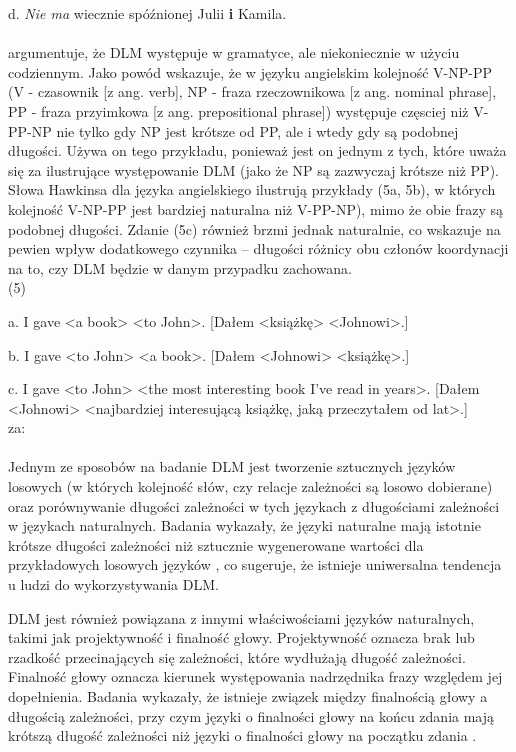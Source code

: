 \documentclass[licencjacka]{pracamgr_Kogni}
\begin{document}
d. \textit{Nie ma} wiecznie spóźnionej Julii \textbf{i} Kamila.
\\
\\
\citet{Hawkins1994} argumentuje, że DLM występuje w gramatyce, ale niekoniecznie w użyciu codziennym. Jako powód wskazuje, że w języku angielskim kolejność V-NP-PP (V - czasownik [z ang. verb], NP - fraza rzeczownikowa [z ang. nominal phrase], PP - fraza przyimkowa [z ang. prepositional phrase]) występuje częsciej niż V-PP-NP nie tylko gdy NP jest krótsze od PP, ale i wtedy gdy są podobnej długości. Używa on tego przykładu, ponieważ jest on jednym z tych, które uważa się za ilustrujące występowanie DLM (jako że NP są zazwyczaj krótsze niż PP). Słowa Hawkinsa dla języka angielskiego ilustrują przykłady (5a, 5b), w których kolejność V-NP-PP jest bardziej naturalna niż V-PP-NP), mimo że obie frazy są podobnej długości. Zdanie (5c) również brzmi jednak naturalnie, co wskazuje na pewien wpływ dodatkowego czynnika --  długości różnicy obu członów koordynacji na to, czy DLM będzie w danym przypadku zachowana.
\\

(5)

a. I gave <a book> <to John>. [Dałem <książkę> <Johnowi>.]

b. I gave <to John> <a book>. [Dałem <Johnowi> <książkę>.]

c. I gave <to John> <the most interesting book I've read in years>. [Dałem <Johnowi> <najbardziej interesującą książkę, jaką przeczytałem od lat>.]\\
za: \citet{AnonimoweNieopublikowane}
\\
\\
Jednym ze sposobów na badanie DLM jest tworzenie sztucznych języków losowych (w których kolejność słów, czy relacje zależności są losowo dobierane) oraz porównywanie długości zależności w tych językach z długościami zależności w językach naturalnych. Badania wykazały, że języki naturalne mają istotnie krótsze długości zależności niż sztucznie wygenerowane wartości dla przykładowych losowych języków \citep{FutrellEtAl2015}, co sugeruje, że istnieje uniwersalna tendencja u ludzi do wykorzystywania DLM.

DLM jest również powiązana z innymi właściwościami języków naturalnych, takimi jak projektywność i finalność głowy. Projektywność oznacza brak lub rzadkość przecinających się zależności, które wydłużają długość zależności. Finalność głowy oznacza kierunek występowania nadrzędnika frazy względem jej dopełnienia. Badania wykazały, że istnieje związek między finalnością głowy a długością zależności, przy czym języki o finalności głowy na końcu zdania mają krótszą długość zależności niż języki o finalności głowy na początku zdania \citep{FutrellEtAl2015}.
\end{document}
